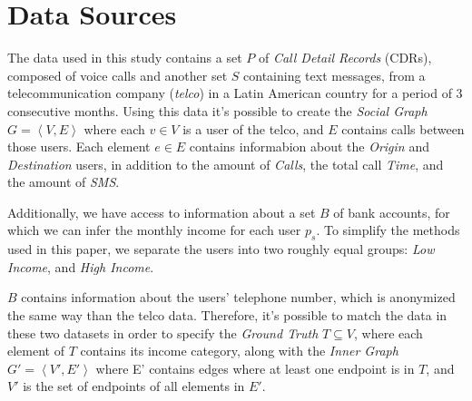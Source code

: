 \section{Data Sources}
\label{sec:data_sources}

The data used in this study contains a set $P$ of \textit{Call Detail Records} (CDRs), composed of voice calls and another set $S$ containing text messages, from a telecommunication company (\textit{telco}) in a Latin American country for a period of 3 consecutive months. Using this data it's possible to create the \emph{Social Graph} $G = \left< V, E \right>$ where each $v \in V$ is a user of the telco, and $E$ contains calls between those users. Each element $e \in E$ contains informabion about the \emph{Origin} and \emph{Destination} users, in addition to the amount of \emph{Calls}, the total call \emph{Time}, and the amount of \emph{SMS}.

Additionally, we have access to information about a set $B$ of bank accounts, for which we can infer the monthly income for each user $p_s$. To simplify the methods used in this paper, we separate the users into two roughly equal groups: \emph{Low Income}, and \emph{High Income}.

$B$ contains information about the users' telephone number, which is anonymized the same way than the telco data.  Therefore, it's possible to match the data in these two datasets in order to specify the \emph{Ground Truth} $T \subseteq V$, where each element of $T$ contains its income category, along with the \emph{Inner Graph} $G' = \left< V', E' \right>$ where E' contains edges where at least one endpoint is in $T$, and $V'$ is the set of endpoints of all elements in $E'$.
